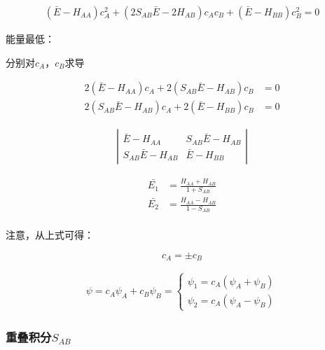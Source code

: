 \begin{align*}
    \left( \bar{E} - H_{AA} \right) c_A^2 + \left( 2S_{AB} \bar{E} - 2H_{AB}   \right)c_Ac_B + \left(  \bar{E} - H_{BB} \right)c_B^2 = 0
\end{align*}


能量最低：

分别对$c_A$，$c_B$求导


\begin{align*}
    2 \left(  \bar{E} - H_{AA}  \right)c_A + 2 \left( S_{AB} \bar{E} - H_{AB}  \right)c_B & = 0 \\
    2 \left(  S_{AB}\bar{E} - H_{AB} \right)c_A + 2 \left( \bar{E} - H_{BB}  \right)c_B   & = 0
\end{align*}


\begin{align*}
    \left| \begin{array}{cc}
               \bar{E} - H_{AA}        & S_{AB} \bar{E} - H_{AB} \\
               S_{AB} \bar{E} - H_{AB} & \bar{E} - H_{BB}
           \end{array} \right|
\end{align*}

\begin{align*}
    \bar{E_1} & = \frac{H_{AA} + H_{AB}}{1 + S_{AB}} \\
    \bar{E_2} & = \frac{H_{AA} - H_{AB}}{1 - S_{AB}} \\
\end{align*}

注意，从上式可得：

\begin{equation*}
    c_A = \pm c_B
\end{equation*}

\begin{align*}
    \psi = c_A \psi_A + c_B \psi_B = \begin{cases}
                                         \psi_1 = c_A(\psi_A + \psi_B) \\
                                         \psi_2 = c_A(\psi_A - \psi_B)
                                     \end{cases}
\end{align*}



\subsubsection{重叠积分$S_{AB}$}

